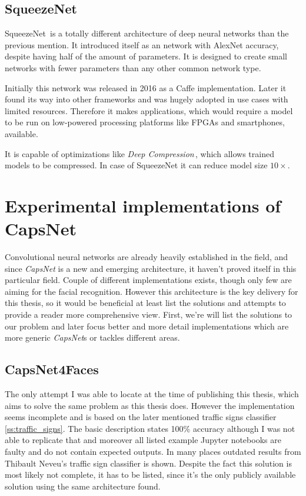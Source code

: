 \subsection{SqueezeNet}

SqueezeNet\,\cite{squeezenet} is a totally different architecture of deep neural networks than the previous mention. It introduced itself as an network with AlexNet accuracy, despite having half of the amount of parameters. It is designed to create small networks with fewer parameters than any other common network type.

Initially this network was released in 2016 as a Caffe implementation. Later it found its way into other frameworks and was hugely adopted in use cases with limited resources. Therefore it makes applications, which would require a model to be run on low-powered processing platforms like FPGAs and smartphones, available.

It is capable of optimizations like \textit{Deep Compression}\,\cite{compression}, which allows trained models to be compressed. In case of SqueezeNet it can reduce model size $10\times$.

\section{Experimental implementations of CapsNet}

Convolutional neural networks are already heavily established in the field, and since \textit{CapsNet} is a new and emerging architecture, it haven't proved itself in this particular field. Couple of different implementations exists, though only few are aiming for the facial recognition. However this architecture is the key delivery for this thesis, so it would be beneficial at least list the solutions and attempts to provide a reader more comprehensive view. First, we're will list the solutions to our problem and later focus better and more detail implementations which are more generic \textit{CapsNet}s or tackles different areas.

\subsection{CapsNet4Faces}

The only attempt I was able to locate at the time of publishing this thesis, which aims to solve the same problem as this thesis does. However the implementation\,\cite{capsnet4faces} seems incomplete and is based on the later mentioned traffic signs classifier\,\ref{ss:traffic_signs}. The basic description states 100\% accuracy although I was not able to replicate that and moreover all listed example Jupyter notebooks are faulty and do not contain expected outputs. In many places outdated results from Thibault Neveu's traffic sign classifier is shown. Despite the fact this solution is most likely not complete, it has to be listed, since it's the only publicly available solution using the same architecture found.


